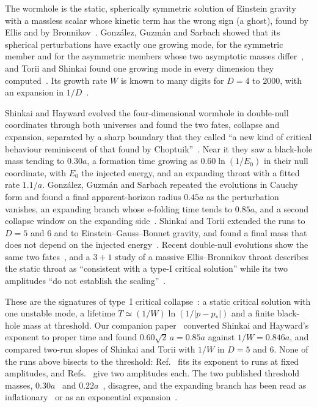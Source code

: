 \documentclass[11pt]{article}
\begin{document}
The wormhole is the static, spherically symmetric solution of Einstein gravity with a massless scalar whose kinetic
term has the wrong sign (a ghost), found by Ellis and by Bronnikov~\cite{Ellis1973,Bronnikov1973}. Gonz\'alez,
Guzm\'an and Sarbach showed that its spherical perturbations have exactly one growing mode, for the symmetric member and
for the asymmetric members whose two asymptotic masses differ~\cite{GGS2009a}, and Torii and Shinkai found one growing
mode in every dimension they computed~\cite{TS2013}. Its growth rate $W$ is known to many digits for $D=4$ to $2000$, with an
expansion in $1/D$~\cite{P3}.

Shinkai and Hayward evolved the four-dimensional wormhole in double-null coordinates through both universes and found
the two fates, collapse and expansion, separated by a sharp boundary that they called ``a new kind of critical behaviour
reminiscent of that found by Choptuik''~\cite{SH2002}. Near it they saw a black-hole mass tending to $0.30a$, a
formation time growing as $0.60\ln(1/E_0)$ in their null coordinate, with $E_0$ the injected energy, and an expanding
throat with a fitted rate $1.1/a$. Gonz\'alez, Guzm\'an and Sarbach repeated the evolutions in Cauchy form and found a
final apparent-horizon radius $0.45a$ as the perturbation vanishes, an expanding branch whose e-folding time tends to
$0.85a$, and a second collapse window on the expanding side~\cite{GGS2009b}. Shinkai and Torii extended the runs to
$D=5$ and $6$ and to Einstein--Gauss--Bonnet gravity, and found a final mass that does not depend on the injected
energy~\cite{ST2017}. Recent double-null evolutions show the same two fates~\cite{XCY2025,Kain2026}, and a $3+1$ study of a massive Ellis--Bronnikov throat describes the static throat as
``consistent with a type-I critical solution'' while its two amplitudes ``do not establish the scaling''~\cite{SN2026}.

These are the signatures of type~I critical collapse~\cite{CCB1996,GMG2007,GHMG2025}: a static critical solution with
one unstable mode, a lifetime $T\simeq(1/W)\ln(1/|p-p_*|)$ and a finite black-hole mass at threshold. Our companion paper~\cite{P3}
converted Shinkai and Hayward's exponent to proper time and found $0.60\sqrt2\,a=0.85a$ against $1/W=0.846a$, and
compared two-run slopes of Shinkai and Torii with $1/W$ in $D=5$ and $6$.
None of the runs above bisects to the threshold: Ref.~\cite{SH2002} fits its exponent to runs at fixed amplitudes,
and Refs.~\cite{ST2017,SN2026} give two amplitudes each. The two published threshold masses, $0.30a$~\cite{SH2002}
and $0.22a$~\cite{GGS2009b}, disagree, and the expanding branch has been read as inflationary~\cite{SH2002} or as an
exponential expansion~\cite{GGS2009b}.
\end{document}

